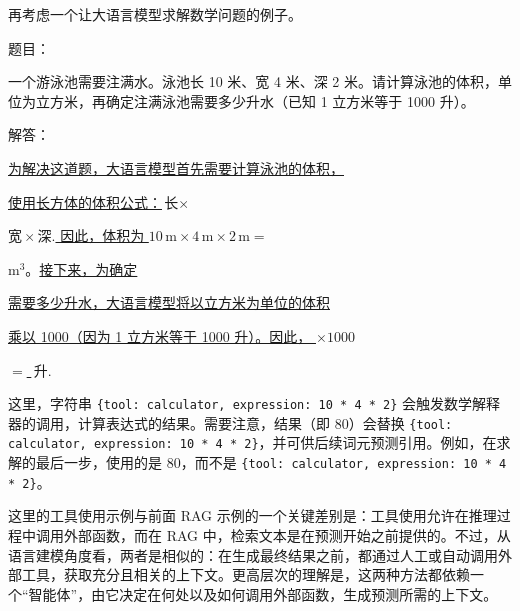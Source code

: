 再考虑一个让大语言模型求解数学问题的例子。

\vspace{0.5em}
\begin{tcolorbox}

\begingroup
\setlength{\leftskip}{2em}
\setlength{\rightskip}{2em}

题目：

\vspace{0.2em}

一个游泳池需要注满水。泳池长 10 米、宽 4 米、深 2 米。请计算泳池的体积，单位为立方米，再确定注满泳池需要多少升水（已知 1 立方米等于 1000 升）。
\vspace{0.5em}

解答：

\underline{为解决这道题，大语言模型首先需要计算泳池的体积，}

\underline{使用长方体的体积公式：$\text{长} \times$}

\underline{$\text{宽} \times \text{深}.$ 因此，体积为 $10 \, \text{m} \times 4 \, \text{m} \times 2 \, \text{m} =$ }

 $\text{m}^3$。\underline{接下来，为确定}

\underline{需要多少升水，大语言模型将以立方米为单位的体积}

\underline{乘以 1000（因为 1 立方米等于 1000 升）。因此， $ \times 1000$}

\underline{$= $  $\, \text{升}.$}

\endgroup

\end{tcolorbox}
\vspace{0.5em}

\noindent 这里，字符串 \texttt{\{tool: calculator, expression: 10 * 4 * 2\}} 会触发数学解释器的调用，计算表达式的结果。需要注意，结果（即 80）会替换 \texttt{\{tool: calculator, expression: 10 * 4 * 2\}}，并可供后续词元预测引用。例如，在求解的最后一步，使用的是 80，而不是 \texttt{\{tool: calculator, expression: 10 * 4 * 2\}}。

这里的工具使用示例与前面 RAG 示例的一个关键差别是：工具使用允许在推理过程中调用外部函数，而在 RAG 中，检索文本是在预测开始之前提供的。不过，从语言建模角度看，两者是相似的：在生成最终结果之前，都通过人工或自动调用外部工具，获取充分且相关的上下文。更高层次的理解是，这两种方法都依赖一个“智能体”，由它决定在何处以及如何调用外部函数，生成预测所需的上下文。

